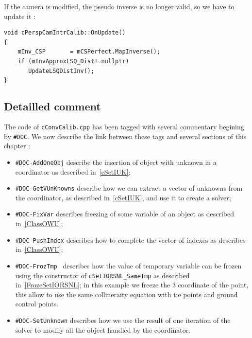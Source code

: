 If the camera is modified, the pseudo inverse is no longer valid, so we have to update it :

\begin{lstlisting}
void cPerspCamIntrCalib::OnUpdate()
{
    mInv_CSP       = mCSPerfect.MapInverse();
    if (mInvApproxLSQ_Dist!=nullptr)
       UpdateLSQDistInv();
}
\end{lstlisting}

\subsection{Detailled comment}

The code of {\tt cConvCalib.cpp} has been tagged with several commentary begining by {\tt \#DOC}.
We now describe the link between these tags and several sections of this chapter :

\begin{itemize}
    \item  {\tt  \#DOC-AddOneObj} describe the insertion of object with unknown in a coordinator
           as described in~\ref{cSetIUK};

    \item  {\tt  \#DOC-GetVUnKnowns} describe how we can extract a vector of unknowns
           from the coordinator, as described in~\ref{cSetIUK}, and use it to create a solver;

    \item {\tt   \#DOC-FixVar} describes freezing of some variable of an object as described in~\ref{ClassOWU};

    \item {\tt  \#DOC-PushIndex} describes how to complete the vector of indexes as describes in~\ref{ClassOWU};

    \item {\tt \#DOC-FrozTmp } describes how the value of temporary variable can be frozen using the
          constructor of {\tt cSetIORSNL\_SameTmp} as described in~\ref{FrozeSetIORSNL};
          in this example we freeze the $3$ coordinate of the point, this allow to use the same
          collineraity equation with tie points and ground control points.

    \item {\tt  \#DOC-SetUnknown} describes how we use the result of one iteration of the solver
          to modify all the object handled by the coordinator.

\end{itemize}

